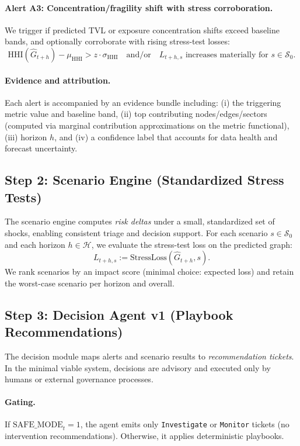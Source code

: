 \paragraph{Alert A3: Concentration/fragility shift with stress corroboration.}
We trigger if predicted TVL or exposure concentration shifts exceed baseline bands, and optionally corroborate with rising stress-test losses:
\begin{equation}
\label{eq:hhi_alert}
\mathrm{HHI}(\widehat{G}_{t+h}) - \mu_{\mathrm{HHI}} > z\cdot \sigma_{\mathrm{HHI}}
\quad \text{and/or} \quad
L_{t+h,s} \text{ increases materially for } s\in\mathcal{S}_0.
\end{equation}

\paragraph{Evidence and attribution.}
Each alert is accompanied by an evidence bundle including: (i) the triggering metric value and baseline band, (ii) top contributing nodes/edges/sectors (computed via marginal contribution approximations on the metric functional), (iii) horizon $h$, and (iv) a confidence label that accounts for data health and forecast uncertainty.

\subsection{Step 2: Scenario Engine (Standardized Stress Tests)}
\label{sec:scenario_engine}
The scenario engine computes \emph{risk deltas} under a small, standardized set of shocks, enabling consistent triage and decision support. For each scenario $s\in\mathcal{S}_0$ and each horizon $h\in\mathcal{H}$, we evaluate the stress-test loss on the predicted graph:
\[
L_{t+h,s} := \mathrm{StressLoss}(\widehat{G}_{t+h}, s).
\]
We rank scenarios by an impact score (minimal choice: expected loss) and retain the worst-case scenario per horizon and overall.

\subsection{Step 3: Decision Agent v1 (Playbook Recommendations)}
\label{sec:decision_v1}
The decision module maps alerts and scenario results to \emph{recommendation tickets}. In the minimal viable system, decisions are advisory and executed only by humans or external governance processes.

\paragraph{Gating.}
If $\mathrm{SAFE\_MODE}_t=1$, the agent emits only \texttt{Investigate} or \texttt{Monitor} tickets (no intervention recommendations). Otherwise, it applies deterministic playbooks.

